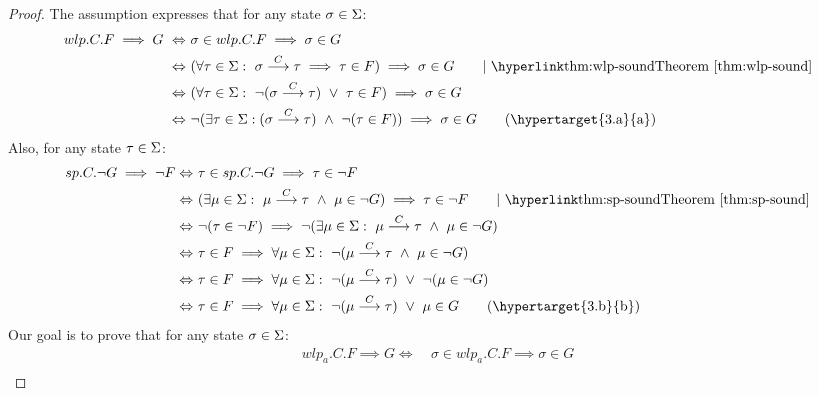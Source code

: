 \newcommand{\lblth}[1]{\hypertarget{3.#1}{{\text{#1}}}}
\newcommand{\refth}[1]{\hyperlink{3.#1}{{\text{Line (#1)}}}}
\begin{proof}
	The assumption expresses that for any state $\sigma\in\S$:
\begin{align*} 
	wlp.C.F\implies G\  \Leftrightarrow&\ \sigma\in wlp.C.F \implies \sigma\in G \\
	\Leftrightarrow&\ ( \forall \tau\in\S:\ \sigma\goto{C}\tau\implies  \tau\in F) \implies \sigma\in G \tag*{$\mid$ \thm{wlp-sound}} \\
	\Leftrightarrow&\ (\forall \tau\in\S:\ \neg(\sigma\goto{C}\tau)\ \vee\ \tau\in F) \implies \sigma\in G \\
	\Leftrightarrow&\ \neg(\exists\tau\in\S:(\sigma\goto{C}\tau)\ \wedge\ \neg(\tau\in F)) \implies \sigma\in G \tag{\lblth{a}} \\
\end{align*}
Also, for any state $\tau\in\S$: 
\begin{align*}
	sp.C.\neg G \implies \neg F \Leftrightarrow&\ \tau\in sp.C.\neg G \implies \tau\in \neg F \\
	\Leftrightarrow&\  (\exists \mu\in\S:\ \mu\goto{C}\tau\ \wedge\ \mu\in\neg G )\implies \tau\in\neg F \tag*{$\mid$ \thm{sp-sound}}\\
	\Leftrightarrow&\  \neg (\tau\in\neg F) \implies \neg (\exists \mu\in\S:\ \mu\goto{C}\tau\ \wedge\ \mu\in\neg G ) \\
	\Leftrightarrow&\  \tau\in F \implies \forall \mu\in\S:\ \neg (\mu\goto{C}\tau\ \wedge\ \mu\in\neg G)\\
	\Leftrightarrow&\  \tau\in F \implies \forall \mu\in\S:\ \neg (\mu\goto{C}\tau)\ \vee\ \neg(\mu\in\neg G)\\
	\Leftrightarrow&\  \tau\in F \implies \forall \mu\in\S:\ \neg (\mu\goto{C}\tau)\ \vee\ \mu\in G
	\tag{\lblth{b}} \\
\end{align*}
Our goal is to prove that for any state $\sigma\in\S$:
\begin{align*}
	wlp_a.C.F \implies G \Leftrightarrow&\ \sigma\in wlp_a.C.F \implies \sigma\in G \\

\end{align*}
\end{proof}
